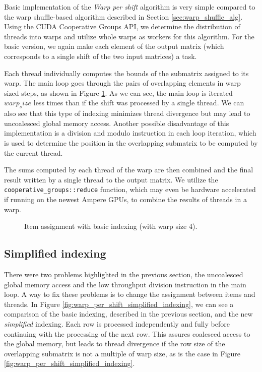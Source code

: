 Basic implementation of the \textit{Warp per shift} algorithm is very simple compared to the warp shuffle-based algorithm described in Section \ref{sec:warp_shuffle_alg}. Using the CUDA Cooperative Groups API, we determine the distribution of threads into warps and utilize whole warps as workers for this algorithm. For the basic version, we again make each element of the output matrix (which corresponds to a single shift of the two input matrices) a task.

Each thread individually computes the bounds of the submatrix assigned to its warp. The main loop goes through the pairs of overlapping elements in warp sized steps, as shown in Figure \ref{fig:warp_per_shift_normal_indexing}. As we can see, the main loop is iterated $warp_size$ less times than if the shift was processed by a single thread. We can also see that this type of indexing minimizes thread divergence but may lead to uncoalesced global memory access. Another possible disadvantage of this implementation is a division and modulo instruction in each loop iteration, which is used to determine the position in the overlapping submatrix to be computed by the current thread.

The sums computed by each thread of the warp are then combined and the final result written by a single thread to the output matrix. We utilize the \texttt{cooperative\_groups::reduce} function, which may even be hardware accelerated if running on the newest Ampere GPUs, to combine the results of threads in a warp.

\begin{figure}[ht]
	\centering
	\def\svgwidth{0.25\textwidth}
	
	\caption{Item assignment with basic indexing (with warp size 4).}
	\label{fig:warp_per_shift_normal_indexing}
\end{figure}


\subsection{Simplified indexing}

There were two problems highlighted in the previous section, the uncoalesced global memory access and the low throughput division instruction in the main loop. A way to fix these problems is to change the assignment between items and threads. In Figure \ref{fig:warp_per_shift_simplified_indexing}, we can see a comparison of the basic indexing, described in the previous section, and the new \textit{simplified} indexing. Each row is processed independently and fully before continuing with the processing of the next row. This assures coalesced access to the global memory, but leads to thread divergence if the row size of the overlapping submatrix is not a multiple of warp size, as is the case in Figure \ref{fig:warp_per_shift_simplified_indexing}.

